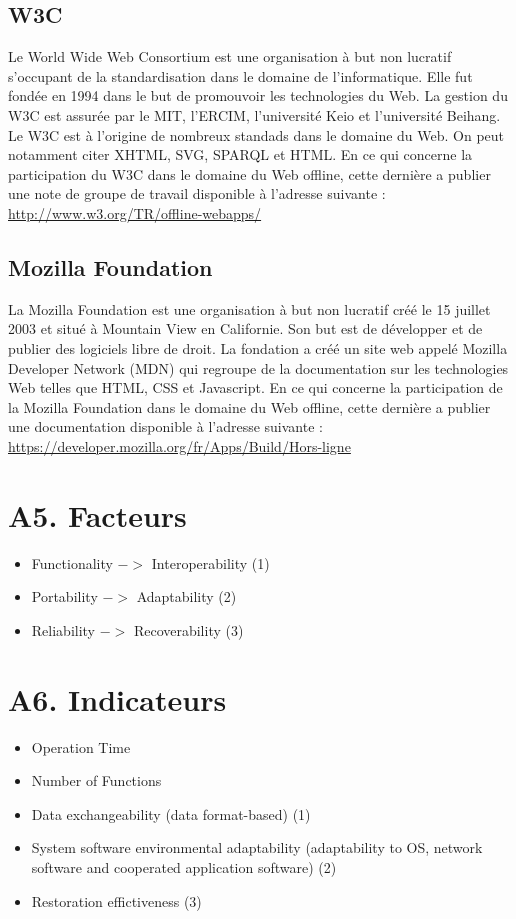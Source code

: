 	\subsection{W3C}
		Le World Wide Web Consortium est une organisation à but non lucratif s’occupant de la standardisation dans le domaine de l’informatique. Elle fut fondée en 1994 dans le but de promouvoir les technologies du Web.
		La gestion du W3C est assurée par le MIT, l’ERCIM, l’université Keio et l’université Beihang. 
		Le W3C est à l’origine de nombreux standads dans le domaine du Web. On peut notamment citer XHTML, SVG, SPARQL et HTML.
		En ce qui concerne la participation du W3C dans le domaine du Web offline, cette dernière a publier une note de groupe de travail disponible à l’adresse suivante :
		\url{http://www.w3.org/TR/offline-webapps/}

	\subsection{Mozilla Foundation}
		La Mozilla Foundation est une organisation à but non lucratif créé le 15 juillet 2003 et situé à Mountain View en Californie. Son but est de développer et de publier des logiciels libre de droit. 
		La fondation a créé un site web appelé Mozilla Developer Network  (MDN) qui regroupe de la documentation sur les technologies Web telles que HTML, CSS et Javascript.
		En ce qui concerne la participation de la Mozilla Foundation dans le domaine du Web offline, cette dernière a publier une documentation disponible à l’adresse suivante :
		\url{https://developer.mozilla.org/fr/Apps/Build/Hors-ligne}

\section{A5. Facteurs}
	
	\begin{itemize}
		\item Functionality $->$ Interoperability (1)
		\item Portability $->$ Adaptability (2)
		\item Reliability $->$ Recoverability (3)
	\end{itemize}

\section{A6. Indicateurs}
	
	\begin{itemize}
		\item Operation Time
		\item Number of Functions
		\item Data exchangeability (data format-based) (1)
		\item System software environmental adaptability (adaptability to OS, network software and cooperated application software) (2)
		\item Restoration effictiveness (3)
	\end{itemize}

